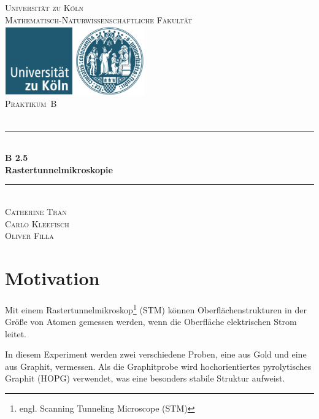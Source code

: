 \documentclass[12pt,a4paper]{scrartcl}
\numberwithin{equation}{section} %
\newcommand{\HRule}{\rule{\linewidth}{0.7mm}}
\begin{document}
\begin{titlepage}
	\pagestyle{empty}

	\begin{center}

	\textsc{\LARGE Universität zu Köln }\\ [0.4cm]
	\textsc{Mathematisch-Naturwissenschaftliche Fakultät} \\[1.5cm]

	\includegraphics[width=0.45\textwidth]{../media/uni.jpg}\\[1.5cm]  %

	\textsc{\Large Praktikum~B}\\[2mm]
	\textsc{}\\[10mm]
	\HRule \\[0.4cm]

		{	\Huge \bfseries B 2.5}\\[0.4cm]
			{	\huge \bfseries Rastertunnelmikroskopie}\\[0.3cm]
	
	\HRule \\[3cm]

		\textsc{\Large Catherine Tran } \\[3pt]
		\textsc{\Large Carlo Kleefisch } \\[3pt]
		\textsc{\Large Oliver Filla } \\[3pt]
		
	\end{center}
\end{titlepage}

\newpage
\tableofcontents
\newpage

\hypertarget{motivation}{%
\section{Motivation}\label{motivation}}

Mit einem Rastertunnelmikroskop\footnote{engl. Scanning Tunneling
  Microscope (STM)} (STM) können Oberflächenstrukturen in der Größe von
Atomen gemessen werden, wenn die Oberfläche elektrischen Strom leitet.

In diesem Experiment werden zwei verschiedene Proben, eine aus Gold und
eine aus Graphit, vermessen. Als die Graphitprobe wird hochorientiertes
pyrolytisches Graphit (HOPG) verwendet, was eine besonders stabile
Struktur aufweist.
\end{document}
